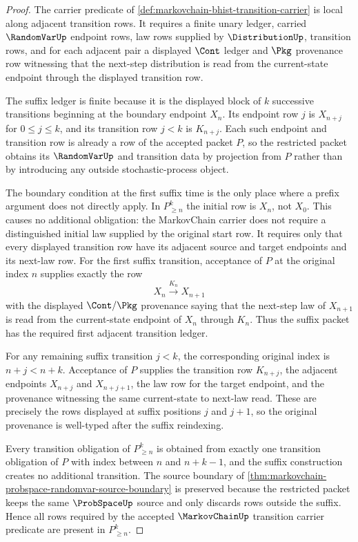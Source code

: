 \begin{proof}
The carrier predicate of \autoref{def:markovchain-bhist-transition-carrier} is local along adjacent transition rows. It requires a finite unary ledger, carried $\RandomVarUp$ endpoint rows, law rows supplied by $\DistributionUp$, transition rows, and for each adjacent pair a displayed $\Cont$ ledger and $\Pkg$ provenance row witnessing that the next-step distribution is read from the current-state endpoint through the displayed transition row.

The suffix ledger is finite because it is the displayed block of $k$ successive transitions beginning at the boundary endpoint $X_n$. Its endpoint row $j$ is $X_{n+j}$ for $0\leq j\leq k$, and its transition row $j<k$ is $K_{n+j}$. Each such endpoint and transition row is already a row of the accepted packet $P$, so the restricted packet obtains its $\RandomVarUp$ and transition data by projection from $P$ rather than by introducing any outside stochastic-process object.

The boundary condition at the first suffix time is the only place where a prefix argument does not directly apply. In $P_{\ge n}^{k}$ the initial row is $X_n$, not $X_0$. This causes no additional obligation: the MarkovChain carrier does not require a distinguished initial law supplied by the original start row. It requires only that every displayed transition row have its adjacent source and target endpoints and its next-law row. For the first suffix transition, acceptance of $P$ at the original index $n$ supplies exactly the row
$$
X_n \xrightarrow{K_n} X_{n+1}
$$
with the displayed $\Cont/\Pkg$ provenance saying that the next-step law of $X_{n+1}$ is read from the current-state endpoint of $X_n$ through $K_n$. Thus the suffix packet has the required first adjacent transition ledger.

For any remaining suffix transition $j<k$, the corresponding original index is $n+j<n+k$. Acceptance of $P$ supplies the transition row $K_{n+j}$, the adjacent endpoints $X_{n+j}$ and $X_{n+j+1}$, the law row for the target endpoint, and the provenance witnessing the same current-state to next-law read. These are precisely the rows displayed at suffix positions $j$ and $j+1$, so the original provenance is well-typed after the suffix reindexing.

Every transition obligation of $P_{\ge n}^{k}$ is obtained from exactly one transition obligation of $P$ with index between $n$ and $n+k-1$, and the suffix construction creates no additional transition. The source boundary of \autoref{thm:markovchain-probspace-randomvar-source-boundary} is preserved because the restricted packet keeps the same $\ProbSpaceUp$ source and only discards rows outside the suffix. Hence all rows required by the accepted $\MarkovChainUp$ transition carrier predicate are present in $P_{\ge n}^{k}$.
\end{proof}
